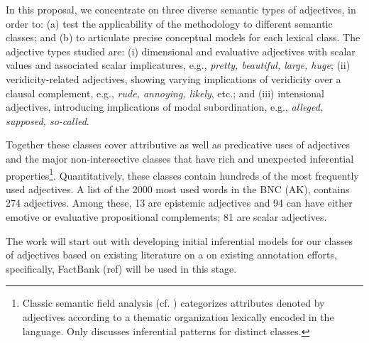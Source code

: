 \documentclass[10pt]{article}
\begin{document}
In this proposal, we concentrate on three diverse semantic types of adjectives, in order to: (a) test the applicability of the methodology to different semantic classes; and (b) to articulate precise conceptual models for each lexical class. The adjective types studied are: (i) dimensional and evaluative adjectives with scalar values and associated scalar implicatures, e.g., \textit{pretty, beautiful, large, huge}; (ii) veridicity-related adjectives, showing varying implications of veridicity over a clausal complement, e.g., \textit{rude, annoying, likely}, etc.; and (iii) intensional adjectives, introducing implications of modal subordination, e.g., \textit{alleged, supposed, so-called}. 

Together these classes cover attributive as well as predicative uses of adjectives and the major non-intersective classes that have rich and unexpected inferential properties\footnote{Classic semantic field analysis (cf. \cite{dixon:91,lyons:77,raskin1995lexical}) categorizes attributes denoted by adjectives according to a thematic organization lexically encoded in the language. Only \cite{raskin1995lexical} discusses inferential patterns for distinct classes.}. Quantitatively, these classes contain hundreds of the most frequently used adjectives. A list of the 2000 most used words in the BNC (AK), contains 274 adjectives. Among these, 13 are epistemic adjectives and 94 can have either emotive or evaluative propositional complements; 81 are scalar adjectives. 

 
The work will start out with developing initial inferential models for our classes of adjectives based on existing literature on a on existing annotation efforts, specifically, FactBank (ref) will be used in this stage.
 
\end{document}
